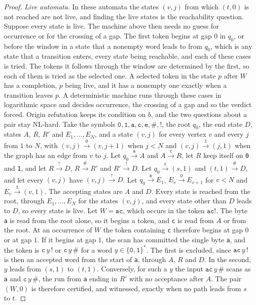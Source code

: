 \documentclass[11pt,a4paper]{article}
\theoremstyle{definition}
\theoremstyle{plain}
\newcommand{\code}[1]{\texttt{#1}}
\begin{document}
\begin{proof}
\emph{Live automata.} In these automata the states $(v, j)$ from which $(t, 0)$ is not reached are not live, and finding
the live states is the reachability question. Suppose every state is live. The machine above then needs no guess for
occurrence or for the crossing of a gap. The first token begins at gap $0$ in $q_0$, or before the window in a state
that a nonempty word leads to from $q_0$, which is any state that a transition enters, every state being reachable, and
each of these cases is tried. The tokens it follows through the window are determined by the first, so each of them is
tried as the selected one. A selected token in the state $p$ after $W$ has a completion, $p$ being live, and it has a
nonempty one exactly when a transition leaves $p$. A deterministic machine runs through these cases in logarithmic space
and decides occurrence, the crossing of a gap and so the verdict forced. Origin refutation keeps its condition on $b$,
and the two questions about a pair stay NL-hard. Take the symbols
$\code{0}, \code{1}, \code{a}, \code{c}, \code{e}, \code{\#}, \code{!}$, the root $q_0$, the end state $D$, states $A$,
$R$, $R'$ and $E_1, \ldots, E_N$, and a state $(v, j)$ for every vertex $v$ and every $j$ from $1$ to $N$, with
$(v, j) \xrightarrow{\code{0}} (v, j + 1)$ when $j < N$ and $(v, j) \xrightarrow{\code{1}} (j, 1)$ when the graph has an
edge from $v$ to $j$. Let $q_0 \xrightarrow{\code{a}} A$ and $A \xrightarrow{\code{c}} R$, let $R$ keep itself on
\code{0} and \code{1}, and let $R \xrightarrow{\code{!}} D$, $R \xrightarrow{\code{\#}} R'$ and
$R' \xrightarrow{\code{!}} D$. Let $q_0 \xrightarrow{\code{c}} (s, 1)$ and $(t, 1) \xrightarrow{\code{\#}} D$, and let
every $(v, j)$ have $(v, j) \xrightarrow{\code{!}} D$. Let $q_0 \xrightarrow{\code{e}} E_1$,
$E_v \xrightarrow{\code{0}} E_{v+1}$ for $v < N$ and $E_v \xrightarrow{\code{1}} (v, 1)$. The accepting states are $A$
and $D$. Every state is reached from the root, through $E_1, \ldots, E_N$ for the states $(v, j)$, and every state other
than $D$ leads to $D$, so every state is live. Let $W = \code{ac}$, which occurs in the token $\code{ac!}$. The byte
\code{a} is read from the root alone, so it begins a token, and \code{c} is read from $A$ or from the root. At an
occurrence of $W$ the token containing \code{c} therefore begins at gap $0$ or at gap $1$. If it begins at gap $1$, the
scan has committed the single byte \code{a}, and the token is $\code{c}\, y\, \code{!}$ or $\code{c}\, y\, \code{\#}$
for a word $y \in \{\code{0}, \code{1}\}^*$. The first is excluded, since $\code{ac}\, y\, \code{!}$ is then an accepted
word from the start of \code{a}, through $A$, $R$ and $D$. In the second, $y$ leads from $(s, 1)$ to $(t, 1)$.
Conversely, for such a $y$ the input $\code{ac}\, y\, \code{\#}$ scans as \code{a} and $\code{c}\, y\, \code{\#}$, the
run from \code{a} ending in $R'$ with no acceptance after $A$. The pair $(W, 0)$ is therefore certified, and witnessed,
exactly when no path leads from $s$ to $t$.


\end{proof}
\end{document}
